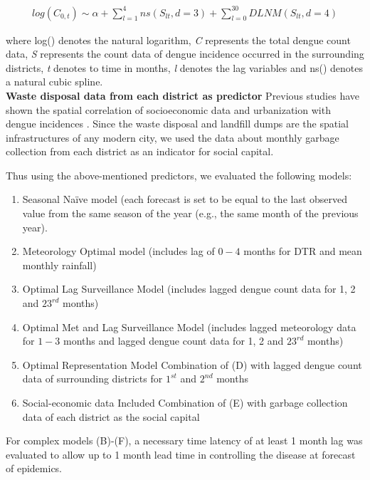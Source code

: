 \documentclass{bmcart}
\begin{document}
\begin{equation}
\begin{aligned}
\label{eq:surrounding}
log (C_{0,t}) \sim \alpha  +  \sum_{l=1}^{4} ns(S_ {lt}, d =3) + \sum_{l=0}^{30} DLNM(S_ {lt}, d = 4) 
\end{aligned}
\end{equation}


where log() denotes the natural logarithm, \textit{C} represents the total dengue count data, \textit{S} represents the count data of dengue incidence occurred in the surrounding districts, \textit{t} denotes to time in months, \textit{l} denotes the lag variables and ns() denotes a natural cubic spline. \\

\textbf{Waste disposal data from each district as predictor} Previous studies have shown the spatial correlation of socioeconomic data and urbanization with dengue incidences \cite{mondini2008spatial,wu2009higher}. Since the waste disposal and landfill dumps are the spatial infrastructures of any modern city, we used the data about monthly garbage collection from each district as an indicator for social capital. 

Thus using the above-mentioned predictors, we evaluated the following models: 
\begin{enumerate}[label=(\Alph*)]
	\item Seasonal Na\"{i}ve model (each forecast is set to be equal to the last observed value from the same season of the year (e.g., the same month of the previous year).
	\item Meteorology Optimal model (includes lag of $0-4$ months for DTR and mean monthly rainfall)
	\item Optimal Lag Surveillance Model (includes lagged dengue count data for 1, 2 and $23^{rd}$ months)
	\item Optimal Met and Lag Surveillance Model (includes lagged meteorology data for $1-3$ months and  lagged dengue count data for 1, 2 and $23^{rd}$ months)
	\item Optimal Representation Model Combination of (D) with lagged dengue count data of surrounding districts for $1^{st}$ and $2^{nd}$ months 
	\item Social-economic data Included Combination of (E) with garbage collection data of each district as the social capital
\end{enumerate}

For complex models (B)-(F), a necessary time latency of at least 1 month lag was evaluated to allow up to 1 month lead time in controlling the disease at forecast of epidemics.
\end{document}
